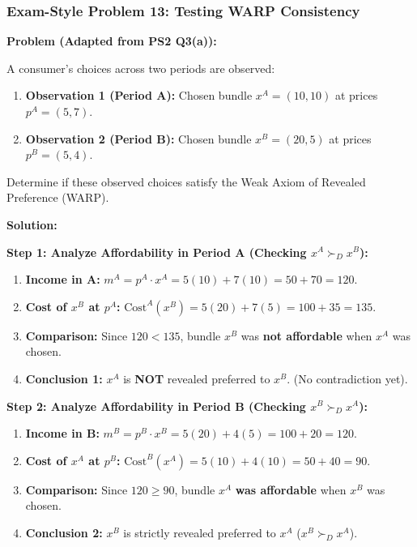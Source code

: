 \documentclass{article}
\begin{document}
\subsubsection*{Exam-Style Problem 13: Testing WARP Consistency}

\textbf{Problem (Adapted from PS2 Q3(a)):}

A consumer's choices across two periods are observed:

\begin{enumerate}
    \item \textbf{Observation 1 (Period A):} Chosen bundle $x^A = (10, 10)$ at prices $p^A = (5, 7)$.
    \item \textbf{Observation 2 (Period B):} Chosen bundle $x^B = (20, 5)$ at prices $p^B = (5, 4)$.
\end{enumerate}

Determine if these observed choices satisfy the Weak Axiom of Revealed Preference (WARP).

\textbf{Solution:}

\textbf{Step 1: Analyze Affordability in Period A (Checking $x^A \succ_D x^B$):}
\begin{enumerate}
    \item \textbf{Income in A:} $m^A = p^A \cdot x^A = 5(10) + 7(10) = 50 + 70 = 120$.
    \item \textbf{Cost of $x^B$ at $p^A$:} $\text{Cost}^A(x^B) = 5(20) + 7(5) = 100 + 35 = 135$.
    \item \textbf{Comparison:} Since $120 < 135$, bundle $x^B$ was \textbf{not affordable} when $x^A$ was chosen.
    \item \textbf{Conclusion 1:} $x^A$ is \textbf{NOT} revealed preferred to $x^B$. (No contradiction yet).
\end{enumerate}

\textbf{Step 2: Analyze Affordability in Period B (Checking $x^B \succ_D x^A$):}
\begin{enumerate}
    \item \textbf{Income in B:} $m^B = p^B \cdot x^B = 5(20) + 4(5) = 100 + 20 = 120$.
    \item \textbf{Cost of $x^A$ at $p^B$:} $\text{Cost}^B(x^A) = 5(10) + 4(10) = 50 + 40 = 90$.
    \item \textbf{Comparison:} Since $120 \geq 90$, bundle $x^A$ \textbf{was affordable} when $x^B$ was chosen.
    \item \textbf{Conclusion 2:} $x^B$ is strictly revealed preferred to $x^A$ ($x^B \succ_D x^A$).
\end{enumerate}
\end{document}
